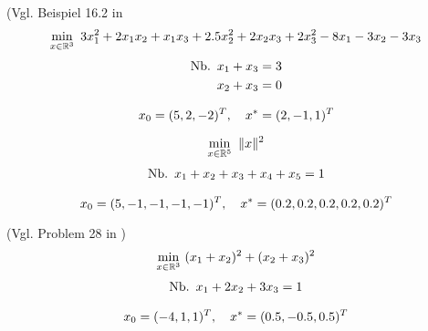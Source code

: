 \begin{testproblem}
(Vgl. Beispiel 16.2 in \cite[S.~452]{nocedal}
\begin{equation}
\min_{x\in\mathbb{R}^3}\ 3 x_1^2 + 2 x_1 x_2 + x_1 x_3 + 2.5 x_2^2 + 2 x_2 x_3 + 2 x_3^2 - 8 x_1 - 3 x_2 - 3 x_3
\end{equation}
\begin{equation*}
\begin{split}
\nb x_1 + x_3 & = 3 \\
x_2 + x_3 & = 0 \\
\end{split}
\end{equation*}

\begin{equation*}
x_0 = (5, 2, -2)^T,\quad x^* = (2, -1, 1)^T
\end{equation*}
\end{testproblem}

\begin{testproblem}
\begin{equation}
\min_{x\in\mathbb{R}^5}\ \| x \|^2
\end{equation}
\begin{equation*}
\begin{split}
\nb x_1 + x_2 + x_3 + x_4 + x_5 & = 1 \\
\end{split}
\end{equation*}

\begin{equation*}
x_0 = (5, -1, -1, -1, -1)^T,\quad x^* = (0.2, 0.2, 0.2, 0.2, 0.2)^T
\end{equation*}
\end{testproblem}

\begin{testproblem}
(Vgl. Problem 28 in \cite[S.~51]{hock})
\begin{equation}
\min_{x\in\mathbb{R}^3}\ (x_1 + x_2)^2 + (x_2 + x_3)^2
\end{equation}
\begin{equation*}
\begin{split}
\nb x_1 + 2 x_2 + 3 x_3 & = 1 \\
\end{split}
\end{equation*}

\begin{equation*}
x_0 = (-4, 1, 1)^T,\quad x^* = (0.5, -0.5, 0.5)^T
\end{equation*}
\end{testproblem}

